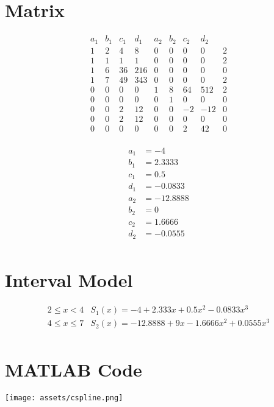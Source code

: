 \documentclass[legalpaper,11pt,extrafontsizes,oneside,openany,x11names]{memoir}
\begin{document}
\section*{Matrix}

\[
\begin{array}{cccccccc|c}
a_1 & b_1 & c_1 & d_1 & a_2 & b_2 & c_2 & d_2 & \\
\hline
1 & 2 & 4 & 8 & 0 & 0 & 0 & 0 & 2 \\
1 & 1 & 1 & 1 & 0 & 0 & 0 & 0 & 2 \\
1 & 6 & 36 & 216 & 0 & 0 & 0 & 0 & 0 \\
1 & 7 & 49 & 343 & 0 & 0 & 0 & 0 & 2 \\
0 & 0 & 0 & 0 & 1 & 8 & 64 & 512 & 2 \\
0 & 0 & 0 & 0 & 0 & 1 & 0 & 0 & 0 \\
0 & 0 & 2 & 12 & 0 & 0 & -2 & -12 & 0 \\
0 & 0 & 2 & 12 & 0 & 0 & 0 & 0 & 0 \\
0 & 0 & 0 & 0 & 0 & 0 & 2 & 42 & 0 \\
\end{array}
\]

\[
\begin{aligned}
a_1 &= -4 \\
b_1 &= 2.3333 \\
c_1 &= 0.5 \\
d_1 &= -0.0833 \\
a_2 &= -12.8888 \\
b_2 &= 0 \\
c_2 &= 1.6666 \\
d_2 &= -0.0555 \\
\end{aligned}
\]

\section*{Interval Model}

\[
\begin{array}{ll}
2 \leq x < 4 & S_1(x) = -4 + 2.333x + 0.5x^2 - 0.0833x^3 \\
4 \leq x \leq 7 & S_2(x) = -12.8888 + 9x - 1.6666x^2 + 0.0555x^3 \\
\end{array}
\]

\section*{MATLAB Code}
\texttt{[image: assets/cspline.png]}
\end{document}
